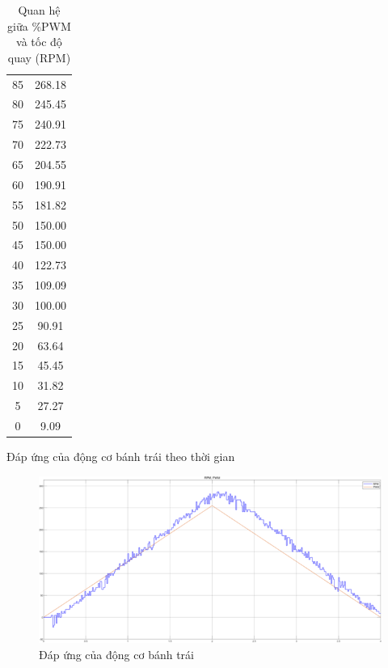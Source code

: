 \begin{table}[h!]
\begin{tabular}{|c|c|}
                         85  & 268.18 \\
                         80  & 245.45 \\
                         75  & 240.91 \\
                         70  & 222.73 \\
                         65  & 204.55 \\
                         60  & 190.91 \\
                         55  & 181.82 \\
                         50  & 150.00 \\
                         45  & 150.00 \\
                         40  & 122.73 \\
                         35  & 109.09 \\
                         30  & 100.00 \\
                         25  & 90.91 \\
                         20  & 63.64 \\
                         15  & 45.45 \\
                         10  & 31.82 \\
                         5   & 27.27 \\
                         0   & 9.09 \\
                         \hline
                    \end{tabular}
                    \caption{Quan hệ giữa \%PWM và tốc độ quay (RPM)}
               \end{table}
               \newpage
               \hspace*{0.6cm}Đáp ứng của động cơ bánh trái theo thời gian
               \begin{figure}[H]
                    \centering
                    \includegraphics[width=1\textwidth]{pictures/chapter5/CJGB2_response.png}
                    \caption{Đáp ứng của động cơ bánh trái}
                    \label{CJGB2_response}
               \end{figure}  
